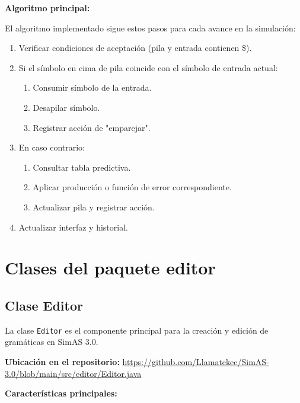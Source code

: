\textbf{Algoritmo principal:}

El algoritmo implementado sigue estos pasos para cada avance en la simulación:

\begin{enumerate}
    \item Verificar condiciones de aceptación (pila y entrada contienen \$).
    \item Si el símbolo en cima de pila coincide con el símbolo de entrada actual:
    \begin{enumerate}
        \item Consumir símbolo de la entrada.
        \item Desapilar símbolo.
        \item Registrar acción de "emparejar".
    \end{enumerate}
    \item En caso contrario:
    \begin{enumerate}
        \item Consultar tabla predictiva.
        \item Aplicar producción o función de error correspondiente.
        \item Actualizar pila y registrar acción.
    \end{enumerate}
    \item Actualizar interfaz y historial.
\end{enumerate}

\section{Clases del paquete editor}

\subsection{Clase Editor}

La clase \texttt{Editor} es el componente principal para la creación y edición de gramáticas en SimAS 3.0.

\textbf{Ubicación en el repositorio:} \url{https://github.com/Llamatekee/SimAS-3.0/blob/main/src/editor/Editor.java}

\textbf{Características principales:}

